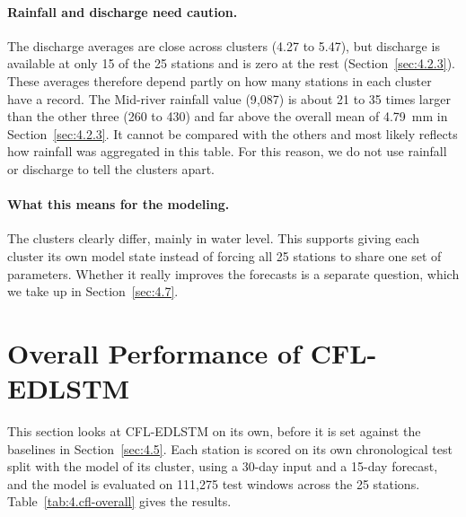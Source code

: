 \paragraph{Rainfall and discharge need caution.}
The discharge averages are close across clusters (4.27 to 5.47), but discharge is
available at only 15 of the 25 stations and is zero at the rest
(Section~\ref{sec:4.2.3}). These averages therefore depend partly on how many
stations in each cluster have a record. The Mid-river rainfall value (9{,}087) is
about 21 to 35 times larger than the other three (260 to 430) and far above the
overall mean of 4.79~mm in Section~\ref{sec:4.2.3}. It cannot be compared with
the others and most likely reflects how rainfall was aggregated in this table.
For this reason, we do not use rainfall or discharge to tell the clusters apart.

\paragraph{What this means for the modeling.}
The clusters clearly differ, mainly in water level. This supports giving each
cluster its own model state instead of forcing all 25 stations to share one set
of parameters. Whether it really improves the forecasts is a separate question,
which we take up in Section~\ref{sec:4.7}.

\section{Overall Performance of CFL-EDLSTM}
\label{sec:4.4}

This section looks at CFL-EDLSTM on its own, before it is set against the
baselines in Section~\ref{sec:4.5}. Each station is scored on its own
chronological test split with the model of its cluster, using a 30-day input and
a 15-day forecast, and the model is evaluated on 111{,}275 test windows across
the 25 stations. Table~\ref{tab:4.cfl-overall} gives the results.

